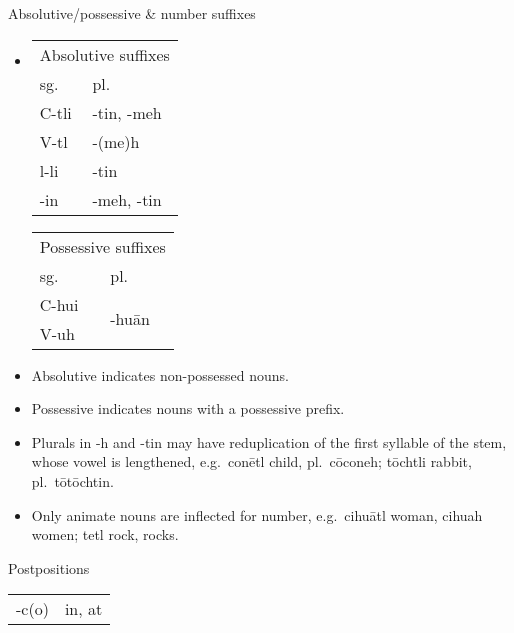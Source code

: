 \documentclass[12pt]{beamer}
\newcommand{\nah}[1]{\textcolor{nahgrn}{#1}}
\newcommand{\trs}[1]{\textcolor{nahblu}{#1}}
\begin{document}
\begin{frame}
\begin{columns}[t]
\begin{column}{.23\linewidth}
      \begin{block}{Absolutive/possessive \& number suffixes}
        \begin{itemize}
          \item
                \begin{tabular}[t]{ll}
                  \multicolumn{2}{c}{Absolutive suffixes} \\
                  sg.         & pl.                       \\
                  \nah{C-tli} & \nah{-tin, -meh}          \\
                  \nah{V-tl}  & \nah{-(me)h}              \\
                  \nah{l-li}  & \nah{-tin}                \\
                  \nah{-in}   & \nah{-meh, -tin}          \\
                \end{tabular}%
                \qquad
                \begin{tabular}[t]{ll}
                  \multicolumn{2}{c}{Possessive suffixes}                           \\
                  sg.         & pl.                                                 \\
                  \nah{C-hui} & \multicolumn{1}{l}{\multirow{2}[0]{*}{\nah{-huān}}} \\
                  \nah{V-uh}  &                                                     \\
                \end{tabular}%
          \item Absolutive indicates non-possessed nouns.
          \item Possessive indicates nouns with a possessive prefix.
          \item Plurals in \nah{-h} and \nah{-tin} may have reduplication of the first syllable of the stem, whose vowel is lengthened, e.g.~\nah{conētl} \trs{child}, pl.~\nah{cōconeh}; \nah{tōchtli} \trs{rabbit}, pl.~\nah{tōtōchtin}.
          \item Only animate nouns are inflected for number, e.g.~\nah{cihuātl} \trs{woman}, \nah{cihuah} \trs{women}; \nah{tetl} \trs{rock, rocks}.
        \end{itemize}
      \end{block}
      \begin{block}{Postpositions}
        \begin{tabular}{ll}
          \nah{-c(o)}     & \trs{in, at}                         \\

\end{tabular}
\end{block}
\end{column}
\end{columns}
\end{frame}
\end{document}
